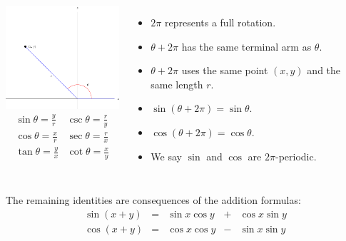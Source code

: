 \begin{frame}
\begin{columns}[c]
\includegraphics[width=5cm]{trigonometry/pictures/app-d-ratiosb.pdf}%
\[
\begin{array}{cc}
\sin \theta = \frac{ y}{ r} &
\csc \theta = \frac{ r}{ y} \\
\cos \theta = \frac{ x}{ r} &
\sec \theta = \frac{ r}{ x} \\
\tan \theta = \frac{ y}{ x} &
\cot \theta = \frac{ x}{ y} \\
\end{array}
\]
\begin{itemize}
\item<2->  $2\pi$ represents a full rotation.
\item<3->  $\theta + 2\pi$ has the same terminal arm as $\theta$.
\item<4->  $\theta + 2\pi$ uses the same point $(x,y)$ and the same length $r$.
\item<5->  $\sin (\theta + 2\pi ) = \sin \theta$.
\item<5->  $\cos (\theta + 2\pi ) = \cos \theta$.
\item<6->  We say $\sin$ and $\cos$ are $2\pi$-periodic.
\end{itemize}
\end{columns}
\end{frame}


\begin{frame}[t]
The remaining identities are consequences of the addition formulas:
\[
\begin{array}{ccccc}
\sin (x + y) & = & \sin x\cos y & + & \cos x \sin y \\
\cos (x + y) & = & \cos x\cos y & - & \sin x \sin y 
\end{array}
\]
\end{frame}



